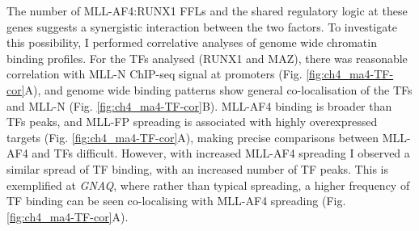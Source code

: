 The number of MLL-AF4:RUNX1 FFLs and the shared regulatory logic at these genes suggests a synergistic interaction between the two factors. To investigate this possibility, I performed correlative analyses of genome wide chromatin binding profiles. For the TFs analysed (RUNX1 and MAZ), there was reasonable correlation with MLL-N ChIP-seq signal at promoters (Fig. \ref{fig:ch4_ma4-TF-cor}A), and genome wide binding patterns show general co-localisation of the TFs and MLL-N (Fig. \ref{fig:ch4_ma4-TF-cor}B). MLL-AF4 binding is broader than TFs peaks, and MLL-FP spreading is associated with highly overexpressed targets \citep{kerry_mll-af4_2017} (Fig. \ref{fig:ch4_ma4-TF-cor}A), making precise comparisons between MLL-AF4 and TFs difficult. However, with increased MLL-AF4 spreading I observed a similar spread of TF binding, with an increased number of TF peaks. This is exemplified at \textit{GNAQ}, where rather than typical spreading, a higher frequency of TF binding can be seen co-localising with MLL-AF4 spreading (Fig. \ref{fig:ch4_ma4-TF-cor}A).

